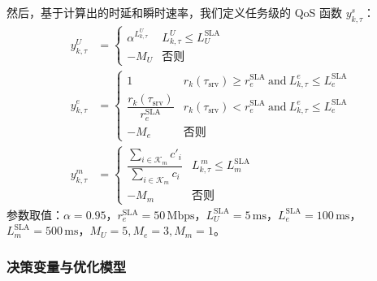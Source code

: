 然后，基于计算出的时延和瞬时速率，我们定义任务级的 QoS 函数 $y^{s}_{k,\tau}$：
\begin{align}
 y^{U}_{k,\tau} &= \begin{cases}
 \alpha^{L^{U}_{k,\tau}} & L^{U}_{k,\tau}\le L^{\text{SLA}}_{U}\\
 -M_U & \text{否则}
 \end{cases} \\
y^{e}_{k,\tau} &= \begin{cases}
 1 & r_{k}(\tau_\text{srv})\ge r^{\text{SLA}}_{e}\ \text{and}\ L^{e}_{k,\tau}\le L^{\text{SLA}}_{e}\\
 \dfrac{r_{k}(\tau_\text{srv})}{r^{\text{SLA}}_{e}} & r_{k}(\tau_\text{srv})< r^{\text{SLA}}_{e}\ \text{and}\ L^{e}_{k,\tau}\le L^{\text{SLA}}_{e}\\
 -M_e & \text{否则}
 \end{cases} \\
 y^{m}_{k,\tau} &= \begin{cases}
 \dfrac{\sum\limits_{i\in\mathcal{K}_m}c'_i}{\sum\limits_{i\in\mathcal{K}_m}c_i} & L^{\,m}_{k,\tau}\le L^{\text{SLA}}_{m}\\
 -M_m & \text{否则}
 \end{cases}
\end{align}
参数取值：$\alpha=0.95$，$r^{\text{SLA}}_e=50\,\mathrm{Mbps}$，$L^{\text{SLA}}_{U}=5\,\mathrm{ms}$，$L^{\text{SLA}}_{e}=100\,\mathrm{ms}$，$L^{\text{SLA}}_{m}=500\,\mathrm{ms}$，$M_U=5, M_e=3, M_m=1$。

\subsubsection{决策变量与优化模型}

